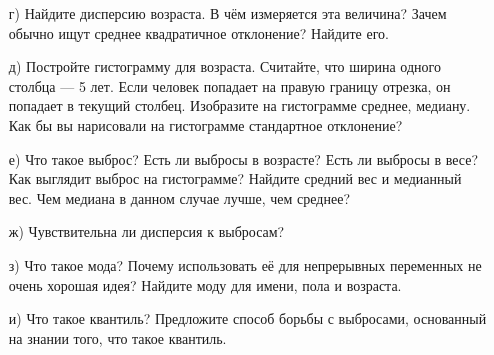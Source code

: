 \documentclass[12pt, a4paper, oneside]{article}
\theoremstyle{plain} %
\theoremstyle{definition}
\newcounter{problem}%
\renewcommand{\theproblem}{\arabic{problem}}
\newenvironment{problem}{
\addtocounter{problem}{1}\noindent{ \color{titleblue} \large \bfseries Упражнение~\theproblem \vspace{1ex} \newline}
}{ }
\begin{document}
\begin{problem}
\begin{enumerate}
	\item[г)] Найдите дисперсию возраста. В чём измеряется эта величина? Зачем обычно ищут среднее квадратичное отклонение? Найдите его. 	
	
	\item[д)]  Постройте гистограмму для возраста. Считайте, что ширина одного столбца --- 5 лет. Если человек попадает на правую границу отрезка, он попадает в текущий столбец.  Изобразите на гистограмме среднее, медиану. Как бы вы нарисовали на гистограмме стандартное отклонение? 
	
	\item[е)] Что такое выброс? Есть ли выбросы в возрасте? Есть ли выбросы в весе? Как выглядит выброс на гистограмме? Найдите средний вес и медианный вес. Чем медиана в данном случае лучше, чем среднее?
	
	\item[ж)] Чувствительна ли дисперсия к выбросам?
	
	\item[з)] Что такое мода? Почему использовать её для непрерывных переменных не очень хорошая идея? Найдите моду для имени, пола и возраста.
	
	\item[и)]  Что такое квантиль? Предложите способ  борьбы с выбросами, основанный на знании того, что такое квантиль.
\end{enumerate}
\end{problem}
\end{document}

